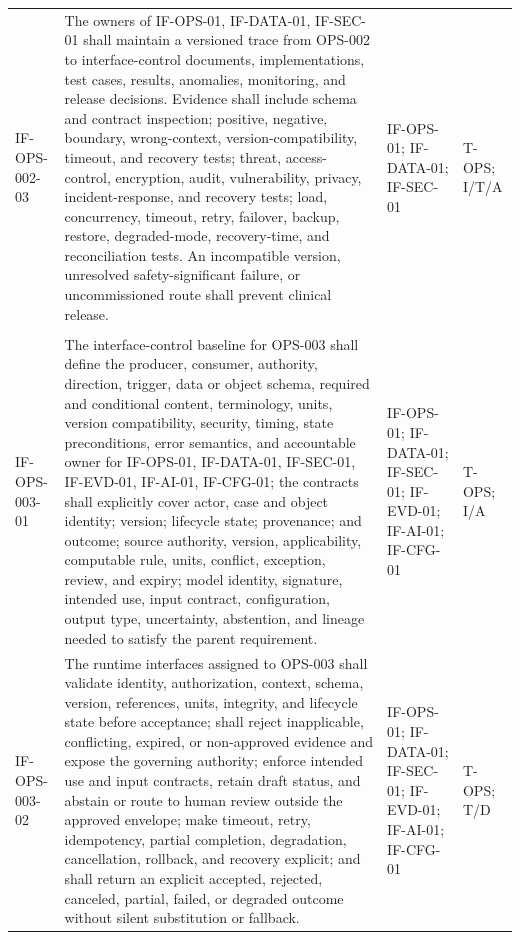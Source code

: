 \documentclass[11pt,letterpaper]{article}
\begin{document}
\begin{scriptsize}
\begin{longtable}{@{}L{0.14\textwidth}L{0.49\textwidth}L{0.19\textwidth}L{0.10\textwidth}@{}}
\addlinespace[2pt]
\mbox{IF-OPS-002-03} & The owners of IF-OPS-01, IF-DATA-01, IF-SEC-01 shall maintain a versioned trace from OPS-002 to interface-control documents, implementations, test cases, results, anomalies, monitoring, and release decisions. Evidence shall include schema and contract inspection; positive, negative, boundary, wrong-context, version-compatibility, timeout, and recovery tests; threat, access-control, encryption, audit, vulnerability, privacy, incident-response, and recovery tests; load, concurrency, timeout, retry, failover, backup, restore, degraded-mode, recovery-time, and reconciliation tests. An incompatible version, unresolved safety-significant failure, or uncommissioned route shall prevent clinical release. & IF-OPS-01; IF-DATA-01; IF-SEC-01 & T-OPS; I\slash\allowbreak{}T\slash\allowbreak{}A \\
\addlinespace[2pt]
 \\
\addlinespace[2pt]
\mbox{IF-OPS-003-01} & The interface-control baseline for OPS-003 shall define the producer, consumer, authority, direction, trigger, data or object schema, required and conditional content, terminology, units, version compatibility, security, timing, state preconditions, error semantics, and accountable owner for IF-OPS-01, IF-DATA-01, IF-SEC-01, IF-EVD-01, IF-AI-01, IF-CFG-01; the contracts shall explicitly cover actor, case and object identity; version; lifecycle state; provenance; and outcome; source authority, version, applicability, computable rule, units, conflict, exception, review, and expiry; model identity, signature, intended use, input contract, configuration, output type, uncertainty, abstention, and lineage needed to satisfy the parent requirement. & IF-OPS-01; IF-DATA-01; IF-SEC-01; IF-EVD-01; IF-AI-01; IF-CFG-01 & T-OPS; I\slash\allowbreak{}A \\
\addlinespace[2pt]
\mbox{IF-OPS-003-02} & The runtime interfaces assigned to OPS-003 shall validate identity, authorization, context, schema, version, references, units, integrity, and lifecycle state before acceptance; shall reject inapplicable, conflicting, expired, or non-approved evidence and expose the governing authority; enforce intended use and input contracts, retain draft status, and abstain or route to human review outside the approved envelope; make timeout, retry, idempotency, partial completion, degradation, cancellation, rollback, and recovery explicit; and shall return an explicit accepted, rejected, canceled, partial, failed, or degraded outcome without silent substitution or fallback. & IF-OPS-01; IF-DATA-01; IF-SEC-01; IF-EVD-01; IF-AI-01; IF-CFG-01 & T-OPS; T\slash\allowbreak{}D \\

\end{longtable}
\end{scriptsize}
\end{document}
